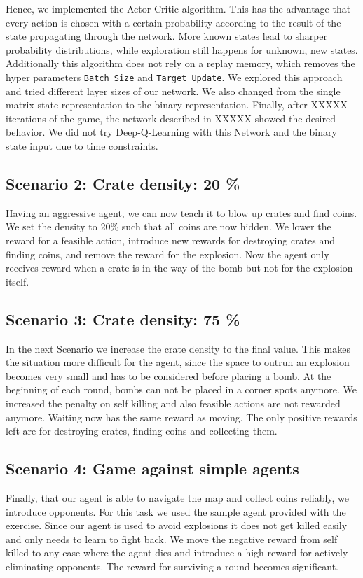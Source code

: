 \documentclass[]{scrartcl}
\begin{document}
Hence, we implemented the Actor-Critic algorithm. This has the advantage that every action is chosen with a certain probability according to the result of the state propagating through the network. More known states lead to sharper probability distributions, while exploration still happens for unknown, new states. Additionally this algorithm does not rely on a replay memory, which removes the hyper parameters \texttt{Batch\_Size} and \texttt{Target\_Update}. We explored this approach and tried different layer sizes of our network. We also changed from the single matrix state representation to the binary representation. Finally, after XXXXX iterations of the game, the network described in XXXXX showed the desired behavior. We did not try Deep-Q-Learning with this Network and the binary state input due to time constraints.

\subsection*{Scenario 2: Crate density: 20 \%}
Having an aggressive agent, we can now teach it to blow up crates and find coins. We set the density to 20\% such that all coins are now hidden. We lower the reward for a feasible action, introduce new rewards for destroying crates and finding coins, and remove the reward for the explosion. Now the agent only receives reward when a crate is in the way of the bomb but not for the explosion itself. 

\subsection*{Scenario 3: Crate density: 75 \%}
In the next Scenario we increase the crate density to the final value. This makes the situation more difficult for the agent, since the space to outrun an explosion becomes very small and has to be considered before placing a bomb. At the beginning of each round, bombs can not be placed in a corner spots anymore. We increased the penalty on self killing and also feasible actions are not rewarded anymore. Waiting now has the same reward as moving. The only positive rewards left are for destroying crates, finding coins and collecting them.

\subsection*{Scenario 4: Game against simple agents}
Finally, that our agent is able to navigate the map and collect coins reliably, we introduce opponents. For this task we used the sample agent provided with the exercise. Since our agent is used to avoid explosions it does not get killed easily and only needs to learn to fight back. We move the negative reward from self killed to any case where the agent dies and introduce a high reward for actively eliminating opponents. The reward for surviving a round becomes significant.
\end{document}
